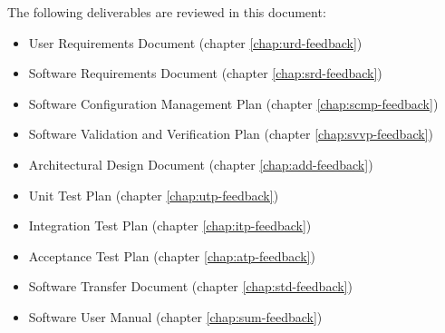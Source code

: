 \documentclass[%
		pathtobase=..,%
		titlefull={Review Document},%
		titleabbr=Review,%
		version=0.15]{fingerpaint}
\begin{document}
\fpstartparagraph{} The following deliverables are reviewed in this document:
\begin{itemize}
\item User Requirements Document \cite{urd} (chapter \ref{chap:urd-feedback})
\item Software Requirements Document \cite{srd} (chapter \ref{chap:srd-feedback})
\item Software Configuration Management Plan \cite{scmp} (chapter \ref{chap:scmp-feedback})
\item Software Validation and Verification Plan \cite{svvp} (chapter \ref{chap:svvp-feedback})
\item Architectural Design Document \cite{add} (chapter \ref{chap:add-feedback})
\item Unit Test Plan \cite{utp} (chapter \ref{chap:utp-feedback})
\item Integration Test Plan \cite{itp} (chapter \ref{chap:itp-feedback})
\item Acceptance Test Plan \cite{atp} (chapter \ref{chap:atp-feedback})
\item Software Transfer Document \cite{std} (chapter \ref{chap:std-feedback})
\item Software User Manual \cite{sum} (chapter \ref{chap:sum-feedback})
\end{itemize}











\end{document}
